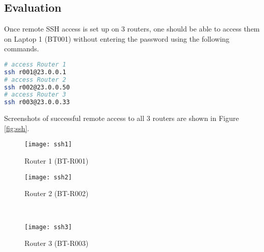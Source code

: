 \subsection{Evaluation}

Once remote SSH access is set up on 3 routers, one should be able to access them on Laptop 1 (BT001) without entering the password using the following commands.

\begin{lstlisting}[language=sh]
# access Router 1
ssh r001@23.0.0.1 
# access Router 2
ssh r002@23.0.0.50
# access Router 3
ssh r003@23.0.0.33
\end{lstlisting}

Screenshots of successful remote access to all 3 routers are shown in Figure \ref{fig:ssh}.

\begin{figure*}[ht!]
    \centering
    \begin{subfigure}[b]{0.67\textwidth}
        \centering
        \texttt{[image: ssh1]}
        \caption{Router 1 (BT-R001)}
    \end{subfigure}
    \hfill
    \begin{minipage}[b]{0.3\textwidth}
	    \begin{subfigure}[b]{\linewidth}
	        \centering
	        \texttt{[image: ssh2]}
	        \caption{Router 2 (BT-R002)}
	    \end{subfigure}
	    \\
	    \begin{subfigure}[b]{\linewidth}
	        \centering
	        \texttt{[image: ssh3]}
	        \caption{Router 3 (BT-R003)}
	    \end{subfigure}
	\end{minipage}
    \caption{Sucessful remote SSH access to all 3 routers from Laptop 1 (BT001).}
    \label{fig:ssh}
\end{figure*}



